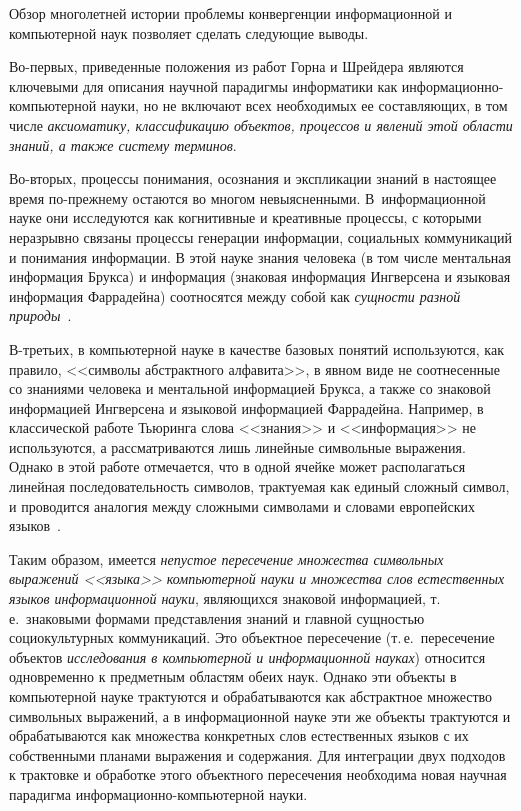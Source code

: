 \begin{multicols}{2}
      Обзор многолетней истории проблемы конвергенции информационной и компьютерной
наук позволяет сделать следующие выводы.

      Во-первых, приведенные положения из работ Горна и Шрейдера являются ключевыми
для описания научной парадигмы информатики как информационно-компьютерной науки, но
не включают всех необходимых ее составляющих, в том числе \textit{аксиоматику,
классификацию объектов, процессов и явлений этой области знаний, а также систему
терминов}.

      Во-вторых, процессы понимания, осознания и экспликации знаний в настоящее время
по-преж\-не\-му остаются во многом невыясненными. В~информационной науке они исследуются
как когнитивные и креативные процессы, с которыми неразрывно связаны процессы генерации
информации, социальных коммуникаций и понимания информации. В этой науке знания
человека (в том числе ментальная информация Брукса) и информация (знаковая информация
Ингверсена и языковая информация Фаррадейна) соотносятся между собой как
\textit{сущности разной природы}~\cite{6za, 13za, 16za}.

      В-третьих, в компьютерной науке в качестве \mbox{базовых} понятий используются, как
правило, <<символы абстрактного алфавита>>, в явном виде не соотнесенные со знаниями
человека и ментальной информацией Брукса, а также со знаковой информацией Ингверсена и
языковой информацией Фаррадейна. Например, в классической работе Тьюринга слова
<<знания>> и <<информация>> не используются, а рассматриваются лишь линейные
символьные выражения. Однако в этой работе отмечается, что в одной ячейке может
располагаться линейная последовательность символов, трактуемая как единый сложный
символ, и проводится аналогия между сложными символами и словами европейских
языков~\cite{28za}.

      Таким образом, имеется \textit{непустое пересечение множества символьных
выражений <<языка>> компьютерной науки и множества слов естественных языков
информационной науки}, являющихся
знаковой информацией, т.\,е.\ знаковыми формами представления знаний и главной сущностью
социокультурных коммуникаций. Это объектное пересечение (т.\,е.\ пересечение объектов
\textit{исследования в компьютерной и информационной науках}) относится одновременно к
предметным областям обеих наук. Однако эти объекты в компьютерной науке трактуются и
обрабатываются как абстрактное множество символьных выражений, а в информационной
науке эти же объекты трактуются и обрабатываются как множества конкретных слов
естественных языков с их собственными планами выражения и содержания. Для интеграции
двух подходов к трактовке и обработке этого объектного пересечения необходима новая
научная парадигма информационно-компьютерной науки.


\end{multicols}
